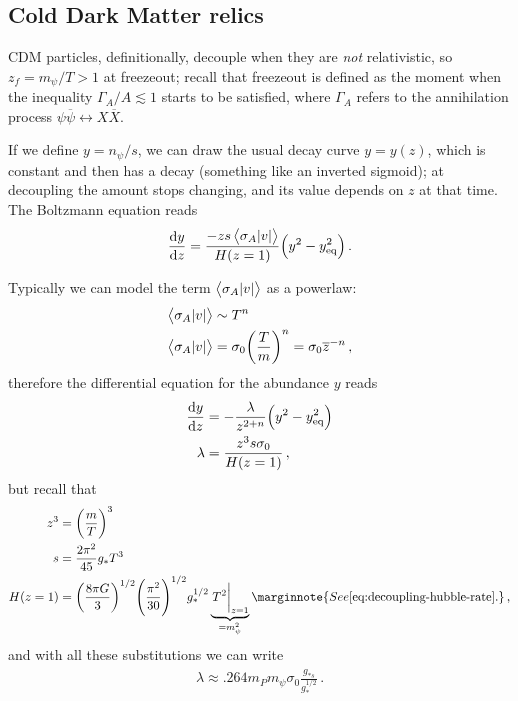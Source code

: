 \documentclass[main.tex]{subfiles}
\begin{document}
\subsection{Cold Dark Matter relics}


CDM particles, definitionally, decouple when they are \emph{not} relativistic, so \(z_f = m_\psi / T > 1\) at freezeout; recall that freezeout is defined as the moment when the inequality \(\Gamma _A / A \lesssim 1\) starts to be satisfied, where \(\Gamma _A\) refers to the annihilation process \(\psi \overline{\psi} \leftrightarrow X \overline{X}\). 

If we define \(y = n_\psi / s\), we can draw the usual decay curve \(y = y(z)\), which is constant and then has a decay (something like an inverted sigmoid); at decoupling the amount stops changing, and its value depends on \(z\) at that time. 
The Boltzmann equation reads 
%
\begin{align}
\dv{y}{z} = \frac{- zs \expval{\sigma _A \abs{v}}}{H (z=1)} \qty(y^2 - y^2 _{\text{eq}})
\,.
\end{align}

Typically we can model the term \(\expval{\sigma_A \abs{v}}\) as a powerlaw: 
%
\begin{align}
\expval{\sigma_A \abs{v}} &\sim T^{n} \\
\expval{\sigma_A \abs{v}} &= \sigma_0 \qty( \frac{T}{m})^{n} = \sigma_0 \overline{z}^{-n}
\,,
\end{align}
%
therefore the differential equation for the abundance \(y\) reads 
%
\begin{align}
\dv{y}{z} &= - \frac{\lambda}{z^{2 + n}} \qty(y^2 - y^2 _{\text{eq}}) \\
\lambda &= \frac{z^3 s \sigma_0 }{H(z=1)}
\,,
\end{align}
%
but recall that 
%
\begin{align}
z^3 &= \qty( \frac{m}{T})^3  \\
s &= \frac{2 \pi^2}{45} g_* T^3  \\
H(z=1) &=  \qty(\frac{8 \pi G}{3})^{1/2} \qty(\frac{\pi^2}{30})^{1/2}
g_*^{1/2} \underbrace{\eval{T^2}_{z=1}}_{= m_\psi^2}
\marginnote{See \eqref{eq:decoupling-hubble-rate}.}
\,,
\end{align}
%
and with all these substitutions we can write 
%
\begin{align}
\lambda \approx \num{.264} m_P m_\psi \sigma_0 \frac{g_{*s}}{g_*^{1/2}}
\,.
\end{align}
\end{document}
